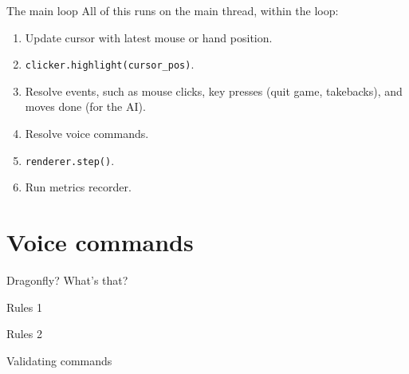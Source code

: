 \documentclass[english]{beamer}
\begin{document}
\begin{frame}{The main loop}
    All of this runs on the main thread, within the loop:

    \begin{enumerate}
        \item Update cursor with latest mouse or hand position.
        \item \texttt{clicker.highlight(cursor\_pos)}.
        \item Resolve events, such as mouse clicks, key presses (quit game, takebacks), and moves done (for the AI).
        \item Resolve voice commands.
        \item \texttt{renderer.step()}.
        \item Run metrics recorder.
    \end{enumerate}
\end{frame}


\section{Voice commands}
\begin{frame}{Dragonfly? What's that?}
\end{frame}

\begin{frame}{Rules 1}
\end{frame}

\begin{frame}{Rules 2}
\end{frame}

\begin{frame}{Validating commands}
\end{frame}
\end{document}
